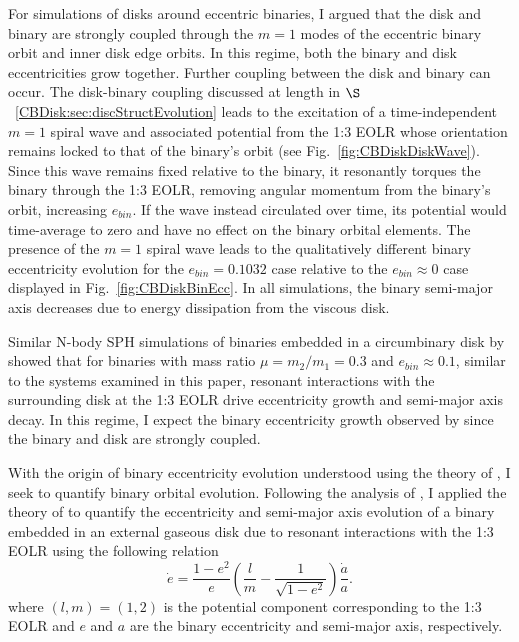 For simulations of disks around eccentric binaries, I argued that the disk and binary are strongly coupled through the $m = 1$ modes of the eccentric binary orbit and inner disk edge orbits.  In this regime, both the binary and disk eccentricities grow together. Further coupling between the disk and binary can occur.  The disk-binary coupling discussed at length in $\S$~\ref{CBDisk:sec:discStructEvolution} leads to the excitation of a time-independent $m = 1$ spiral wave and associated potential from the 1:3 EOLR whose orientation remains locked to that of the binary's orbit (see Fig.~\ref{fig:CBDiskDiskWave}).  Since this wave remains fixed relative to the binary, it resonantly torques the binary through the 1:3 EOLR, removing angular momentum from the binary's orbit, increasing $e_{bin}$.  If the wave instead circulated over time, its potential would time-average to zero and have no effect on the binary orbital elements.  The presence of the $m = 1$ spiral wave leads to the qualitatively different binary eccentricity evolution for the $e_{bin} = 0.1032$ case relative to the $e_{bin} \approx 0$ case displayed in Fig.~\ref{fig:CBDiskBinEcc}.  In all simulations, the binary semi-major axis decreases due to energy dissipation from the viscous disk. 

Similar N-body SPH simulations of
binaries embedded in a circumbinary disk by \citet{Artymowicz1991} showed that for binaries with mass ratio $\mu = m_2/m_1 = 0.3$ and $e_{bin} \approx 0.1$, similar to the systems examined in this paper, resonant interactions with the surrounding disk at the 1:3 EOLR drive eccentricity growth and semi-major axis decay.  In this regime, I expect the binary eccentricity growth observed by \citet{Artymowicz1991} since the binary and disk are strongly coupled.

With the origin of binary eccentricity evolution understood using
the theory of \citet{Papaloizou2001}, I seek to quantify binary orbital
evolution.  Following the analysis of \citet{Dermine2013}, I applied the theory of \citet{Artymowicz1996b,Artymowicz2000} to quantify the eccentricity and semi-major axis 
evolution of a binary embedded in an external gaseous disk due to resonant interactions with the 1:3 EOLR using the following 
relation
\begin{equation} 
\label{CBDisk:eqn:deda}
\dot{e} = \frac{1 - e^2}{e} \left(\frac{l}{m} - \frac{1}{\sqrt{1 - e^2}}\right)\frac{\dot{a}}{a}.
\end{equation}
where $(l,m) = (1,2)$ is the potential component corresponding to the 1:3 EOLR \citep{Artymowicz1991,Artymowicz2000} and $e$ and $a$ are the binary eccentricity and semi-major axis, respectively.

